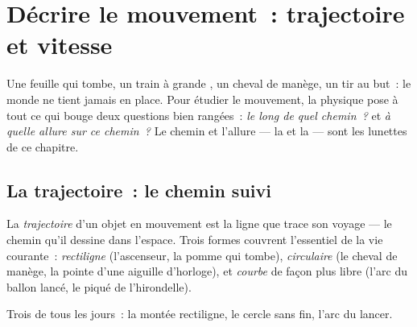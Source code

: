 \chapter{Décrire le mouvement~: trajectoire et vitesse}\label{ch:g6:describing-motion}

Une feuille qui tombe, un train à grande , un cheval de
manège, un tir au but~: le monde ne tient jamais en place. Pour
étudier le mouvement, la physique pose à tout ce qui bouge deux
questions bien rangées~: \emph{le long de quel chemin~?} et \emph{à
quelle allure sur ce chemin~?} Le chemin et l'allure --- la
 et la  --- sont les lunettes de ce chapitre.

\section{La trajectoire~: le chemin suivi}

\begin{definition}[Trajectoire]\label{def:g6:describing-motion:trajectory}
La \emph{trajectoire} d'un objet en mouvement est
la ligne que trace son voyage --- le chemin qu'il dessine dans
l'espace. Trois formes couvrent l'essentiel de la vie courante~:
\emph{rectiligne} (l'ascenseur, la
pomme qui tombe), \emph{circulaire} (le
cheval de manège, la pointe d'une aiguille d'horloge), et
\emph{courbe} de façon plus libre (l'arc du ballon lancé, le piqué de
l'hirondelle).
\end{definition}

\begin{omfigure}

{\small Trois  de tous les jours~: la montée rectiligne,
le cercle sans fin, l'arc du lancer.}
\end{omfigure}

